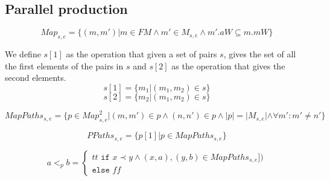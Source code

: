 \subsection{Parallel production}

\[Map_{s, e} = \{(m, m')| m \in FM \land m' \in M_{s,e} \land m'.aW \subseteq m.mW\} \]

We define $s[1]$ as the operation that given a set of pairs $s$, gives the set of all the first elements of the pairs in $s$ and $s[2]$ as the operation that gives the second elements.
\[s[1] = \{m_1 | (m_1, m_2) \in s\}\]
\[s[2] = \{m_2 | (m_1, m_2) \in s\}\]

\[MapPaths_{s,e} = \{p \in {Map}_{s,e}^2 | (m,m') \in p \land (n,n') \in p \land |p| = |M_{s,e}| \land  \forall m': m' \neq n' \}\]

\[ PPaths_{s,e} = \{p[1] | p \in MapPaths_{s,e}\}\]

\[a <_{p} b = 
\left\{\begin{matrix}
tt \texttt{ if } x \prec y \land (x, a), (y, b) \in MapPaths_{s,e}])\\
\texttt{else } ff
\end{matrix}\right.\]